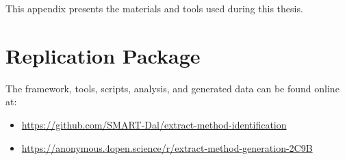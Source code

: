 This appendix presents the materials and tools used during this thesis.

\section{Replication Package}\label{appendix}

The framework, tools, scripts, analysis, and generated data can be found online at:

\begin{itemize}
    \item \href{https://github.com/SMART-Dal/extract-method-identification}{https://github.com/SMART-Dal/extract-method-identification}
    \item \href{https://anonymous.4open.science/r/extract-method-generation-2C9B}{https://anonymous.4open.science/r/extract-method-generation-2C9B}
\end{itemize}

